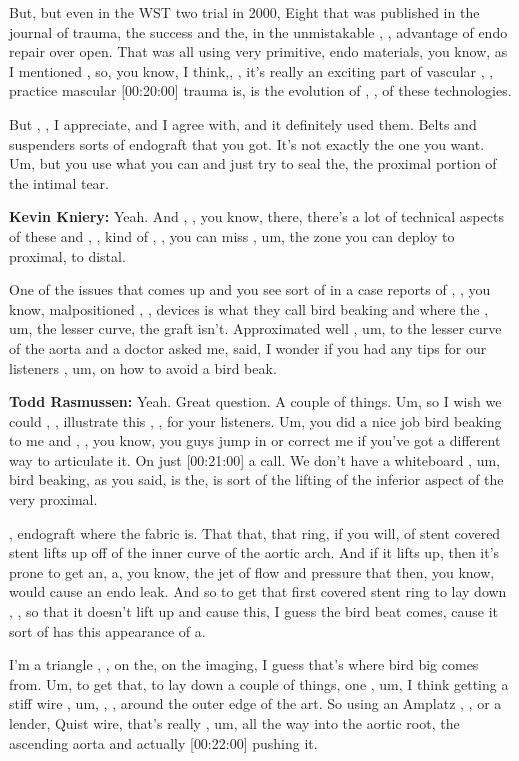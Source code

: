\documentclass[
]{book}
\begin{document}
But, but even in the WST two trial in 2000, Eight that was published in
the journal of trauma, the success and the, in the unmistakable , ,
advantage of endo repair over open. That was all using very primitive,
endo materials, you know, as I mentioned , so, you know, I think,, ,
it's really an exciting part of vascular , , practice mascular
{[}00:20:00{]} trauma is, is the evolution of , , of these technologies.

But , , I appreciate, and I agree with, and it definitely used them.
Belts and suspenders sorts of endograft that you got. It's not exactly
the one you want. Um, but you use what you can and just try to seal the,
the proximal portion of the intimal tear.

\textbf{Kevin Kniery:} Yeah. And , , you know, there, there's a lot of
technical aspects of these and , , kind of , , you can miss , um, the
zone you can deploy to proximal, to distal.

One of the issues that comes up and you see sort of in a case reports of
, , you know, malpositioned , , devices is what they call bird beaking
and where the , um, the lesser curve, the graft isn't. Approximated well
, um, to the lesser curve of the aorta and a doctor asked me, said, I
wonder if you had any tips for our listeners , um, on how to avoid a
bird beak.

\textbf{Todd Rasmussen:} Yeah. Great question. A couple of things. Um, so I
wish we could , , illustrate this , , for your listeners. Um, you did a
nice job bird beaking to me and , , you know, you guys jump in or
correct me if you've got a different way to articulate it. On just
{[}00:21:00{]} a call. We don't have a whiteboard , um, bird beaking, as you
said, is the, is sort of the lifting of the inferior aspect of the very
proximal.

, endograft where the fabric is. That that, that ring, if you will, of
stent covered stent lifts up off of the inner curve of the aortic arch.
And if it lifts up, then it's prone to get an, a, you know, the jet of
flow and pressure that then, you know, would cause an endo leak. And so
to get that first covered stent ring to lay down , , so that it doesn't
lift up and cause this, I guess the bird beat comes, cause it sort of
has this appearance of a.

I'm a triangle , , on the, on the imaging, I guess that's where bird big
comes from. Um, to get that, to lay down a couple of things, one , um, I
think getting a stiff wire , um, , , around the outer edge of the art.
So using an Amplatz , , or a lender, Quist wire, that's really , um, all
the way into the aortic root, the ascending aorta and actually
{[}00:22:00{]} pushing it.
\end{document}

